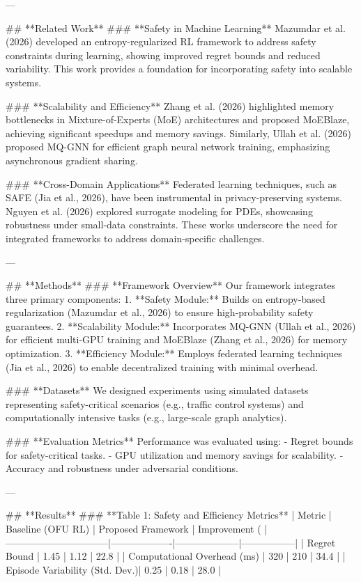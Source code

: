 ---

## **Related Work**
### **Safety in Machine Learning**
Mazumdar et al. (2026) developed an entropy-regularized RL framework to address safety constraints during learning, showing improved regret bounds and reduced variability. This work provides a foundation for incorporating safety into scalable systems.

### **Scalability and Efficiency**
Zhang et al. (2026) highlighted memory bottlenecks in Mixture-of-Experts (MoE) architectures and proposed MoEBlaze, achieving significant speedups and memory savings. Similarly, Ullah et al. (2026) proposed MQ-GNN for efficient graph neural network training, emphasizing asynchronous gradient sharing.

### **Cross-Domain Applications**
Federated learning techniques, such as SAFE (Jia et al., 2026), have been instrumental in privacy-preserving systems. Nguyen et al. (2026) explored surrogate modeling for PDEs, showcasing robustness under small-data constraints. These works underscore the need for integrated frameworks to address domain-specific challenges.

---

## **Methods**
### **Framework Overview**
Our framework integrates three primary components:
1. **Safety Module:** Builds on entropy-based regularization (Mazumdar et al., 2026) to ensure high-probability safety guarantees.
2. **Scalability Module:** Incorporates MQ-GNN (Ullah et al., 2026) for efficient multi-GPU training and MoEBlaze (Zhang et al., 2026) for memory optimization.
3. **Efficiency Module:** Employs federated learning techniques (Jia et al., 2026) to enable decentralized training with minimal overhead.

### **Datasets**
We designed experiments using simulated datasets representing safety-critical scenarios (e.g., traffic control systems) and computationally intensive tasks (e.g., large-scale graph analytics).

### **Evaluation Metrics**
Performance was evaluated using:
- Regret bounds for safety-critical tasks.
- GPU utilization and memory savings for scalability.
- Accuracy and robustness under adversarial conditions.

---

## **Results**
### **Table 1: Safety and Efficiency Metrics**
| Metric                         | Baseline (OFU RL) | Proposed Framework | Improvement (%
|--------------------------------|-------------------|--------------------|-----------------|
| Regret Bound                   | 1.45              | 1.12               | 22.8            |
| Computational Overhead (ms)    | 320               | 210                | 34.4            |
| Episode Variability (Std. Dev.)| 0.25              | 0.18               | 28.0            |

